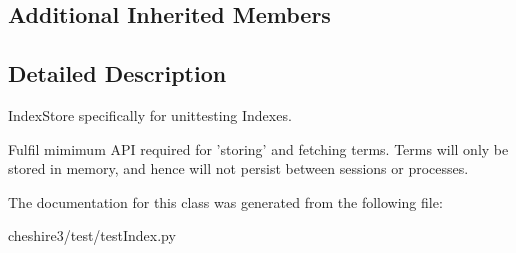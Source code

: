 \subsection*{Additional Inherited Members}


\subsection{Detailed Description}
\begin{DoxyVerb}IndexStore specifically for unittesting Indexes.

Fulfil mimimum API required for 'storing' and fetching terms. Terms
will only be stored in memory, and hence will not persist between
sessions or processes.
\end{DoxyVerb}
 

The documentation for this class was generated from the following file\-:\begin{DoxyCompactItemize}
\item 
cheshire3/test/test\-Index.\-py\end{DoxyCompactItemize}
